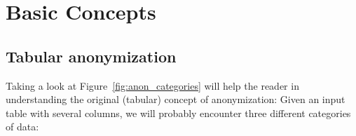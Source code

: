 \documentclass{llncs}
\begin{document}
\begin {comment}
\section{Glossary and Key Terms}
NOTE: this section may not to be used for a conference
\textbf{Note: This is only for use when producing a Springer LNCS SOTA State-of-the-Art-Analysis paper}
\\[0,2cm]
\emph{SaNGreeA} is the abbreviation for Social Network Greedy Anonymization, which describes an anonymization algorithm which takes into account information loss as well as structural loss (from anonymizing the neighborhood of a network node). It is said to be greedy as it uses greedy clustering under the hood in order to avoid having to sift through an exponential solution space to find an optimum.

\end{comment}

\section{Basic Concepts}
\label{sect:basic_concepts}

\subsection{Tabular anonymization}
\label{ssect:tab_anonym}

Taking a look at Figure~\ref{fig:anon_categories} will help the reader in understanding the original (tabular) concept of anonymization: Given an input table with several columns, we will probably encounter three different categories of data:
\end{document}
